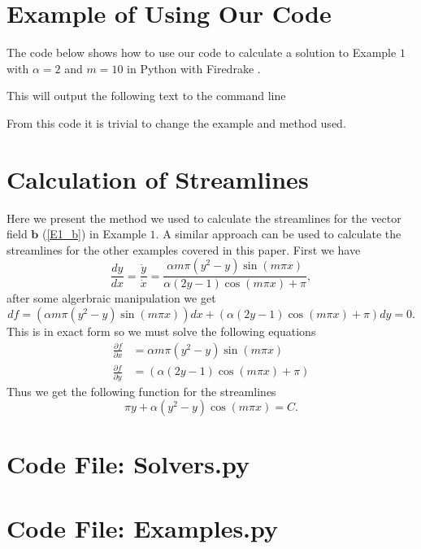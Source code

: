 \documentclass[12pt]{ociamthesis}
\begin{document}
\printbibliography[heading=bibintoc]

\appendix

\chapter{Example of Using Our Code}
The code below shows how to use our code to calculate a solution to Example $1$ with $\alpha=2$ and $m=10$ in Python with Firedrake \cite{Dragon}.

This will output the following text to the command line

From this code it is trivial to change the example and method used.

\chapter{Calculation of Streamlines} \label{E1_Stream_Calc}
Here we present the method we used to calculate the streamlines for the vector field $\mathbf{b}$ (\ref{E1_b}) in Example $1$. A similar approach can be used to calculate the streamlines for the other examples covered in this paper. First we have
\begin{equation}
\frac{dy}{dx} = \frac{\dot{y}}{\dot{x}} = 
\frac{\alpha m \pi (y^2-y)\sin(m \pi x)}{\alpha(2y-1)\cos(m\pi x) + \pi},
\end{equation}
after some algerbraic manipulation we get
\begin{equation}
df = (\alpha m\pi (y^2-y)\sin(m\pi x))dx + 
(\alpha(2y-1)\cos(m\pi x)+\pi)dy = 0.
\end{equation}
This is in exact form so we must solve the following equations
\begin{align}
\frac{\partial f}{\partial x} &= \alpha m\pi (y^2-y)\sin(m\pi x)\\
\frac{\partial f}{\partial y} &= (\alpha(2y-1)\cos(m\pi x)+\pi)
\end{align}
Thus we get the following function for the streamlines
\begin{equation}
\pi y + \alpha (y^2-y)\cos(m\pi x) = C.
\end{equation}

\chapter{Code File: Solvers.py} \label{CFSolve}

\chapter{Code File: Examples.py} \label{CFExample}
\end{document}
